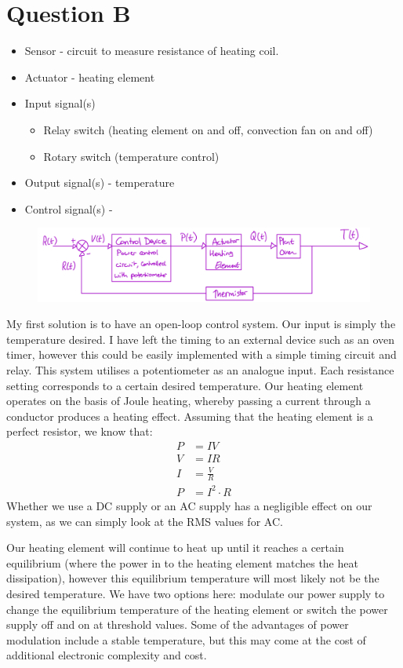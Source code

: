 \documentclass[12pt]{article}
\numberwithin{equation}{section}
\begin{document}
\section{Question B}
\begin{itemize}
  \item Sensor - circuit to measure resistance of heating coil.
  \item Actuator - heating element
  \item Input signal(s)
    \begin{itemize}
      \item Relay switch (heating element on and off, convection fan on and off)
      \item Rotary switch (temperature control)
    \end{itemize}
  \item Output signal(s) - temperature
  \item Control signal(s) - 
\end{itemize}
\begin{figure}[H]
  \centering
  \includegraphics[width=\textwidth]{./img/2-1blockdiagram.png}
\end{figure}
My first solution is to have an open-loop control system. Our input is simply the temperature desired. I have left the timing to an external device such as an oven timer, however this could be easily implemented with a simple timing circuit and relay. This system utilises a potentiometer as an analogue input. Each resistance setting corresponds to a certain desired temperature. Our heating element operates on the basis of Joule heating, whereby passing a current through a conductor produces a heating effect. Assuming that the heating element is a perfect resistor, we know that:
\begin{align}
  P &= IV\\
  V &= IR\\
  I &= \frac{V}{R}\\
  P &= I^2 \cdot R
\end{align}
Whether we use a DC supply or an AC supply has a negligible effect on our system, as we can simply look at the RMS values for AC. 

Our heating element will continue to heat up until it reaches a certain equilibrium (where the power in to the heating element matches the heat dissipation), however this equilibrium temperature will most likely not be the desired temperature. We have two options here: modulate our power supply to change the equilibrium temperature of the heating element or switch the power supply off and on at threshold values. Some of the advantages of power modulation include a stable temperature, but this may come at the cost of additional electronic complexity and cost. 
\end{document}
